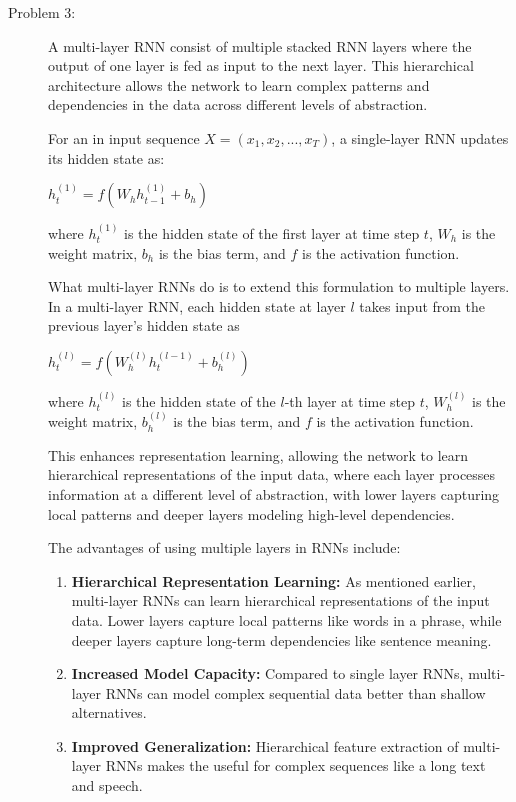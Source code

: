 \documentclass[10pt]{article}
\begin{document}
\begin{description}
\pagebreak

\item[Problem 3:] \hfill %

A multi-layer RNN consist of multiple stacked RNN layers where the output of one layer is fed as input to the next layer.
This hierarchical architecture allows the network to learn complex patterns and dependencies in the data across different levels of abstraction.

For an in input sequence $X = (x_1, x_2, ..., x_T)$, a single-layer RNN updates its hidden state as:

\begin{center}
    $h_t^{(1)} = f(W_{h}h_{t-1}^{(1)} + b_h)$
\end{center}

where $h_t^{(1)}$ is the hidden state of the first layer at time step $t$, $W_{h}$ is the weight matrix, $b_h$ is the bias term, and $f$ is the activation function.

What multi-layer RNNs do is to extend this formulation to multiple layers. In a multi-layer RNN, each hidden state at layer $l$ takes input from the previous layer's hidden state as

\begin{center}
    $h_t^{(l)} = f(W_{h}^{(l)}h_t^{(l-1)} + b_h^{(l)})$
\end{center}

where $h_t^{(l)}$ is the hidden state of the $l$-th layer at time step $t$, $W_{h}^{(l)}$ is the weight matrix, $b_h^{(l)}$ is the bias term, and $f$ is the activation function.

This enhances representation learning, allowing the network to learn hierarchical representations of the input data, where each layer processes information at a different level of abstraction, with lower layers 
capturing local patterns and deeper layers modeling high-level dependencies.

The advantages of using multiple layers in RNNs include:

\begin{enumerate}
    \item \textbf{Hierarchical Representation Learning:} As mentioned earlier, multi-layer RNNs can learn hierarchical representations of the input data.
    Lower layers capture local patterns like words in a phrase, while deeper layers capture long-term dependencies like sentence meaning.
    \item \textbf{Increased Model Capacity:} Compared to single layer RNNs, multi-layer RNNs can model complex sequential data better than shallow alternatives.
    \item \textbf{Improved Generalization:} Hierarchical feature extraction of multi-layer RNNs makes the useful for complex sequences like a long text and speech.
\end{enumerate}


\end{description}
\end{document}
